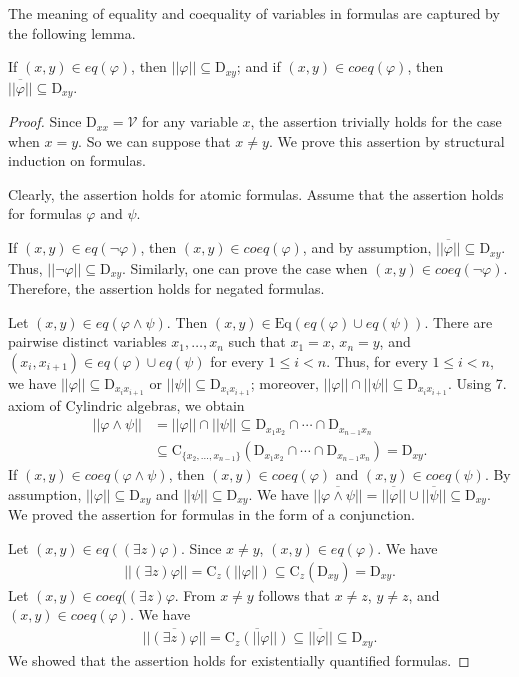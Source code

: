 \documentclass{lmcs}
\def\tu#1{( #1)}
\def\C{\textrm{C}}
\def\D{\textrm{D}}
\def\V{\mathcal V}
\def\eq{eq}
\def\coeq{coeq}
\def\Eq{{\textrm{Eq}}}
\begin{document}
The meaning of equality and coequality of variables in formulas are captured by the following lemma.
\begin{lem}\label{lem:eq_coeq}
If $\tu{x,y}\in\eq(\varphi)$, then $||\varphi||\subseteq\D_{xy}$; and if $\tu{x,y}\in\coeq(\varphi)$, then $\overline{||\varphi||}\subseteq\D_{xy}$.
\end{lem}
\begin{proof}
Since $\D_{xx}=\V$ for any variable $x$, the assertion trivially holds for the case when $x=y$. So we can suppose that $x\neq y$.  We prove this assertion by structural induction on formulas. 

Clearly, the assertion holds for atomic formulas. Assume that the assertion holds for formulas $\varphi$ and $\psi$.

If $\tu{x,y}\in\eq(\neg\varphi)$, then $\tu{x,y}\in\coeq(\varphi)$, and by assumption, $\overline{||\varphi||}\subseteq\D_{xy}$. Thus, $||\neg\varphi||\subseteq\D_{xy}$. Similarly, one can prove the case when $\tu{x,y}\in\coeq(\neg\varphi)$. Therefore, the assertion holds for negated formulas.

Let $\tu{x,y}\in\eq(\varphi\wedge\psi)$. Then $\tu{x,y}\in\Eq(\eq(\varphi)\cup\eq(\psi))$. There are pairwise distinct variables $x_1,\ldots,x_n$ such that $x_1=x$, $x_n=y$, and $\tu{x_i,x_{i+1}}\in\eq(\varphi)\cup\eq(\psi)$ for every $1\leq i< n$. Thus, for every $1\leq i<n$, we have $||\varphi||\subseteq\D_{x_ix_{i+1}}$ or $||\psi||\subseteq\D_{x_ix_{i+1}}$; moreover, $||\varphi||\cap||\psi||\subseteq\D_{x_ix_{i+1}}$.  Using 7. axiom of Cylindric algebras, we obtain
\begin{align*}
||\varphi\wedge\psi||&= ||\varphi||\cap||\psi||\subseteq\D_{x_1x_2}\cap\cdots\cap\D_{x_{n-1}x_n}\\
&\subseteq\C_{\{x_2,\ldots,x_{n-1}\}}(\D_{x_1x_2}\cap\cdots\cap\D_{x_{n-1}x_n})=\D_{xy}.
\end{align*}
If $\tu{x,y}\in\coeq(\varphi\wedge\psi)$, then $\tu{x,y}\in\coeq(\varphi)$ and $\tu{x,y}\in\coeq(\psi)$. By assumption, $||\varphi||\subseteq\D_{xy}$ and  $||\psi||\subseteq\D_{xy}$. We have $\overline{||\varphi\wedge\psi||}=\overline{||\varphi||}\cup\overline{||\psi||}\subseteq \D_{xy}$. We proved the assertion for formulas in the form of a conjunction.

Let $\tu{x,y}\in\eq((\exists z)\varphi)$. Since $x\neq y$, $\tu{x,y}\in\eq(\varphi)$. We have
\begin{align*}
||(\exists z)\varphi||=\C_z(||\varphi||)\subseteq\C_z(\D_{xy})=\D_{xy}. 
\end{align*}
Let $\tu{x,y}\in\coeq((\exists z)\varphi$. From $x\neq y$ follows that $x\neq z$, $y\neq z$, and $\tu{x,y}\in\coeq(\varphi)$. We have
\begin{align*}
\overline{||(\exists z)\varphi||}=\overline{\C_z(||\varphi||)}\subseteq\overline{||\varphi||}\subseteq\D_{xy}. 
\end{align*}
We showed that the assertion holds for existentially quantified formulas.
\end{proof}
\end{document}
